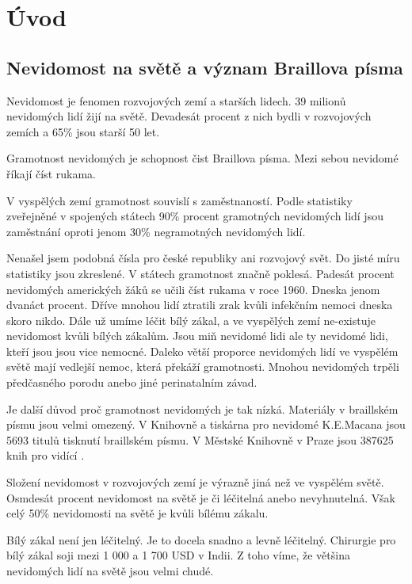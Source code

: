 
\chapter{Úvod}

\section{Nevidomost na světě a význam Braillova písma}

Nevidomost je fenomen rozvojových zemí a starších lidech. 39 milionů nevidomých lidí žijí na světě. Devadesát procent z nich bydli v rozvojových zemích a 65\% jsou starší 50 let\citep{whodata}.

Gramotnost nevidomých je schopnost čist Braillova písma.  Mezi sebou nevidomé říkají číst rukama.

V vyspělých zemí gramotnost souvislí s zaměstnaností. Podle statistiky zveřejněné v spojených státech 90\% procent gramotných nevidomých lidí jsou zaměstnání oproti jenom 30\% negramotných nevidomých lidí.

Nenašel jsem podobná čísla pro české republiky ani rozvojový svět.  Do jisté míru statistiky jsou zkreslené.  V státech gramotnost značně poklesá.  Padesát procent nevidomých amerických žáků se učili číst rukama v roce 1960. Dneska jenom dvanáct procent.  Dříve mnohou lidí ztratili zrak kvůli infekčním nemoci dneska skoro nikdo. Dále už umíme léčit bílý zákal, a ve vyspělých zemí ne-existuje nevidomost kvůli bílých zákalům.  Jsou miň nevidomé lidi ale ty nevidomé lidi, kteří jsou jsou vice nemocné.  Daleko větší proporce nevidomých lidí ve vyspělém světě mají vedlejší nemoc, která překáží gramotnosti.  Mnohou nevidomých trpěli předčasného porodu anebo jiné perinatalním závad\citep{perkins,whozakal,whodata}.

Je další důvod proč gramotnost nevidomých je tak nízká.  Materiály v braillském písmu jsou velmi omezený.  V Knihovně a tiskárna pro nevidomé K.E.Macana jsou 5693 titulů tisknutí braillském písmu\citep{biblio}. V Městské Knihovně v Praze jsou 387625 knih pro vidící \citep{mlp}.

Složení nevidomost v rozvojových zemí je výrazně jiná než ve vyspělém světě. Osmdesát procent nevidomost na světě je či léčitelná anebo nevyhnutelná\citep{whodata}.  Však celý 50\% nevidomosti na světě je kvůli bílému zákalu\citep{whozakal}.

Bílý zákal není jen léčitelný. Je to docela snadno a levně léčitelný. Chirurgie pro bílý zákal soji mezi 1 000 a 1 700 USD v Indii\citep{cataractsindia}. Z toho víme, že většina nevidomých lidí na světě jsou velmi chudé.

